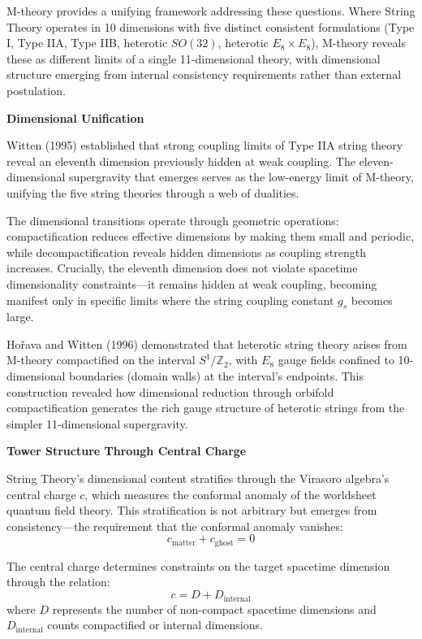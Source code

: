 M-theory provides a unifying framework addressing these questions. Where String Theory operates in 10 dimensions with five distinct consistent formulations (Type I, Type IIA, Type IIB, heterotic $SO(32)$, heterotic $E_8 \times E_8$), M-theory reveals these as different limits of a single 11-dimensional theory, with dimensional structure emerging from internal consistency requirements rather than external postulation.

\textbf{Dimensional Unification}

Witten (1995) \cite{Witten1995} established that strong coupling limits of Type IIA string theory reveal an eleventh dimension previously hidden at weak coupling. The eleven-dimensional supergravity that emerges serves as the low-energy limit of M-theory, unifying the five string theories through a web of dualities.

The dimensional transitions operate through geometric operations: compactification reduces effective dimensions by making them small and periodic, while decompactification reveals hidden dimensions as coupling strength increases. Crucially, the eleventh dimension does not violate spacetime dimensionality constraints—it remains hidden at weak coupling, becoming manifest only in specific limits where the string coupling constant $g_s$ becomes large.

Hořava and Witten (1996) \cite{HoravaWitten1996} demonstrated that heterotic string theory arises from M-theory compactified on the interval $S^1/\mathbb{Z}_2$, with $E_8$ gauge fields confined to 10-dimensional boundaries (domain walls) at the interval's endpoints. This construction revealed how dimensional reduction through orbifold compactification generates the rich gauge structure of heterotic strings from the simpler 11-dimensional supergravity.

\textbf{Tower Structure Through Central Charge}

String Theory's dimensional content stratifies through the Virasoro algebra's central charge $c$, which measures the conformal anomaly of the worldsheet quantum field theory. This stratification is not arbitrary but emerges from consistency—the requirement that the conformal anomaly vanishes:
\[
    c_{\text{matter}} + c_{\text{ghost}} = 0
\]

The central charge determines constraints on the target spacetime dimension through the relation:
\[
    c = D + D_{\text{internal}}
\]
where $D$ represents the number of non-compact spacetime dimensions and $D_{\text{internal}}$ counts compactified or internal dimensions.

